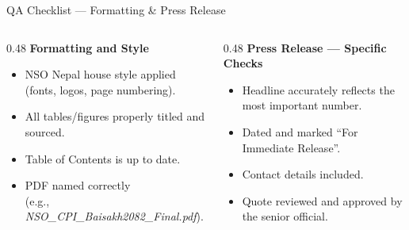 \documentclass[xcolor={table,dvipsnames},aspectratio=169,11pt]{beamer}
\begin{document}
\begin{frame}{QA Checklist --- Formatting \& Press Release}
    \begin{columns}[t]
        \begin{column}{0.48\textwidth}
            \textbf{Formatting and Style}
            \begin{itemize}
                \item[$\square$] NSO Nepal house style applied (fonts, logos, page numbering).
                \item[$\square$] All tables/figures properly titled and sourced.
                \item[$\square$] Table of Contents is up to date.
                \item[$\square$] PDF named correctly \\ (e.g., \textit{NSO\_CPI\_Baisakh2082\_Final.pdf}).
            \end{itemize}
        \end{column}
        \begin{column}{0.48\textwidth}
            \textbf{Press Release --- Specific Checks}
            \begin{itemize}
                \item[$\square$] Headline accurately reflects the most important number.
                \item[$\square$] Dated and marked ``For Immediate Release''.
                \item[$\square$] Contact details included.
                \item[$\square$] Quote reviewed and approved by the senior official.
            \end{itemize}
        \end{column}
    \end{columns}
\end{frame}
\end{document}
